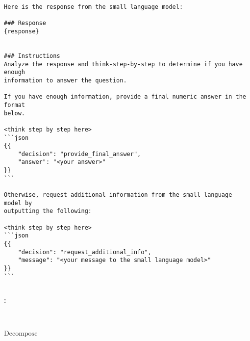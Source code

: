 \begin{tcolorbox}[colback=gray!10,  width=\textwidth]
\begin{lstlisting}[breaklines]
Here is the response from the small language model:

### Response
{response}


### Instructions
Analyze the response and think-step-by-step to determine if you have enough 
information to answer the question.

If you have enough information, provide a final numeric answer in the format
below.

<think step by step here>
```json
{{
    "decision": "provide_final_answer",  
    "answer": "<your answer>"
}}
```

Otherwise, request additional information from the small language model by 
outputting the following:

<think step by step here>
```json
{{
    "decision": "request_additional_info",
    "message": "<your message to the small language model>"
}}
```
\end{lstlisting}
\end{tcolorbox}


\subsection{\system}





\paragraph{\system: \finance} \

\textbf{$\mathrm{Decompose}$}


